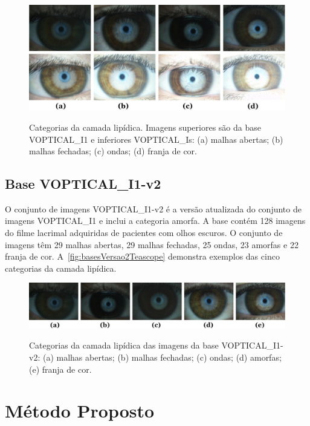 \begin{figure}[ht!]
    \centering
    \caption{Categorias da camada lipídica. Imagens superiores são da base VOPTICAL\_I1 e inferiores VOPTICAL\_Is: (a) malhas abertas; (b) malhas fechadas; (c) ondas; (d) franja de cor.}
    \includegraphics[width=15.4cm]{figs/DuasBases1.png}
    \label{fig:2basesTeascope}
\end{figure}

\subsection{Base VOPTICAL\_I1-v2}

O conjunto de imagens VOPTICAL\_I1-v2 \cite{voptical_gcuvarpa_i1-v2} é a versão atualizada do conjunto de imagens VOPTICAL\_I1 e inclui a categoria amorfa. A base contém 128 imagens do filme lacrimal adquiridas de pacientes com olhos escuros. O conjunto de imagens têm 29 malhas abertas, 29 malhas fechadas, 25 ondas, 23 amorfas e 22 franja de cor. A~\autoref{fig:basesVersao2Teascope} demonstra exemplos das cinco categorias da camada lipídica.

\begin{figure}[ht!]
    \centering
    \caption{Categorias da camada lipídica das imagens da base VOPTICAL\_I1-v2: (a) malhas abertas; (b) malhas fechadas; (c) ondas; (d) amorfas; (e) franja de cor.}
    \includegraphics[width=15.8cm]{figs/BaseVersao2.png}
    \label{fig:basesVersao2Teascope}
\end{figure}

\section{Método Proposto}
\label{sec:metodoProposto}

